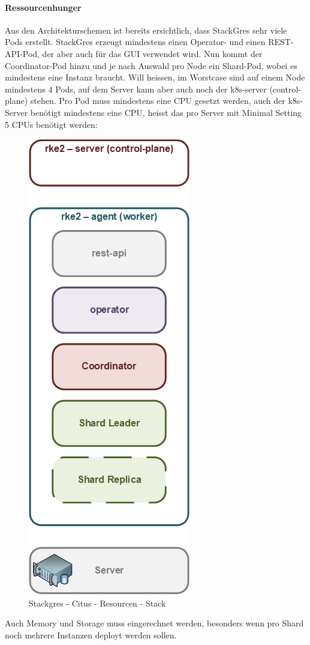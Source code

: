 \begin{flushleft}
    \paragraph{Ressourcenhunger}
    Aus den Architekturschemen ist bereits ersichtlich, dass StackGres sehr viele Pods erstellt.
    StackGres erzeugt mindestens einen Operator- und einen REST-API-Pod, der aber auch für das GUI verwendet wird.
    Nun kommt der Coordinator-Pod hinzu und je nach Auswahl pro Node ein Shard-Pod, wobei es mindestens eine Instanz braucht.
    Will heissen, im Worstcase sind auf einem Node mindestens 4 Pods, auf dem Server kann aber auch noch der k8s-server (control-plane) stehen.
    Pro Pod muss mindestens eine CPU gesetzt werden, auch der k8s-Server benötigt mindestens eine CPU, heisst das pro Server mit Minimal Setting 5 CPUs benötigt werden:
    \begin{figure}[H]
        \centering
        \includegraphics[width=0.2\linewidth]{source/implementation/evaluation/postgresql_ha_solutions/stackgres/stackgres_citus_architecture_resource_stack}
        \caption{Stackgres - Citus - Resourcen - Stack}
        \label{fig:stackgres_citus_architecture_resource_stack}
    \end{figure}
    Auch Memory und Storage muss eingerechnet werden, besonders wenn pro Shard noch mehrere Instanzen deployt werden sollen.
\end{flushleft}

